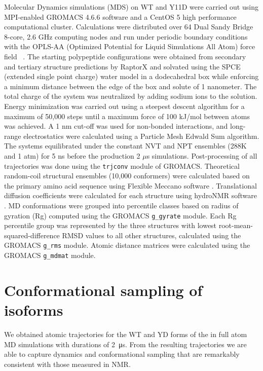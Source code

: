 Molecular Dynamics simulations (MDS) on WT and Y11D \gct were carried out using MPI-enabled GROMACS 4.6.6 software\cite{hess2008gromacs} and a CentOS 5 high performance computational cluster. Calculations were distributed over 64 Dual Sandy Bridge 8-core, 2.6 GHz computing nodes and run under periodic boundary conditions with the OPLS-AA (Optimized Potential for Liquid Simulations All Atom) force field ~\cite{kaminski2001evaluation}.  The starting \gct polypeptide configurations were obtained from secondary and tertiary structure predictions by RaptorX \cite{kallberg2012template} and solvated using the SPCE (extended single point charge) water model in a dodecahedral box while enforcing a minimum distance between the edge of the box and solute of 1 nanometer. The total charge of the system was neutralized by adding sodium ions to the solution. Energy minimization was carried out using a steepest descent algorithm for a maximum of 50,000 steps until a maximum force of 100 kJ/mol between atoms was achieved. A 1 nm cut-off was used for non-bonded interactions, and long-range electrostatics were calculated using a Particle Mesh Edwald Sum algorithm. The systems equilibrated under the constant NVT and NPT ensembles (288K and 1 atm) for 5 ns before the production 2 $\mu$s simulations. Post-processing of all trajectories was done using the \texttt{trjconv} module of GROMACS. Theoretical random-coil structural ensembles (10,000 conformers) were calculated based on the \gct primary amino acid sequence using Flexible Meccano software \cite{ozenne2012flexible}. Translational diffusion coefficients were calculated for each structure using hydroNMR software \cite{de2000hydronmr}. 
MD conformations were grouped into percentile classes based on radius of gyration (Rg) computed using the GROMACS \texttt{g\_gyrate} module. Each Rg percentile group was represented by the three structures with lowest root-mean-squared-difference RMSD values to all other structures, calculated using the GROMACS \texttt{g\_rms} module. Atomic distance matrices were calculated using the GROMACS \texttt{g\_mdmat} module.


\section{Conformational sampling of \gct isoforms}

We obtained atomic trajectories for the WT and YD forms of the \gct in full atom MD simulations with durations of \SI{2}{\us}. From the resulting trajectories we are able to capture dynamics and conformational sampling that are remarkably consistent with those measured in NMR.\\


